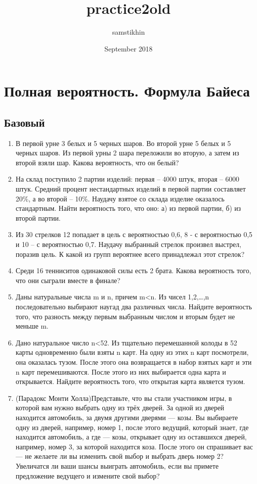 \documentclass[a4paper, 14pt]{extarticle}
\title{practice2old}
\author{samstikhin}
\date{September 2018}
\begin{document}
\section*{Полная вероятность. Формула Байеса}
\subsection*{Базовый}
\begin{enumerate}
\item В первой урне 3 белых и 5 черных шаров. Во второй урне 5 белых и 5 черных шаров. Из первой урны 2 шара переложили во вторую, а затем из второй взяли шар. Какова вероятность, что он белый?
\item На склад поступило 2 партии изделий: первая – 4000 штук, вторая – 6000 штук. Средний процент нестандартных изделий в первой партии составляет 20\%, а во второй – 10\%. Наудачу взятое со склада изделие оказалось стандартным. Найти вероятность того, что оно: а) из первой партии, б) из второй партии.
\item Из 30 стрелков 12 попадает в цель с вероятностью 0,6, 8 - с вероятностью 0,5 и 10 – с вероятностью 0,7. Наудачу выбранный стрелок произвел выстрел, поразив цель. К какой из групп вероятнее всего принадлежал этот стрелок? 
\item Среди 16 тенниситов одинаковой силы есть 2 брата. Какова вероятность того, что они сыграли вместе в финале?
\item Даны натуральные числа m и n, причем m<n. Из чисел 1,2,…,n последовательно выбирают наугад
два различных числа. Найдите вероятность того, что разность между первым выбранным числом и вторым будет не меньше m.
\item Дано натуральное число n<52. Из тщательно перемешанной колоды в 52 карты одновременно были взяты n карт. На одну из этих n карт посмотрели, она оказалась тузом. После этого она возвращается в набор взятых карт и эти n карт перемешиваются. После этого из них выбирается одна карта и открывается. Найдите вероятность того, что открытая карта является тузом.
\item (Парадокс Монти Холла)Представьте, что вы стали участником игры, в которой вам нужно выбрать одну из трёх дверей. За одной из дверей находится автомобиль, за двумя другими дверями — козы. Вы выбираете одну из дверей, например, номер 1, после этого ведущий, который знает, где находится автомобиль, а где — козы, открывает одну из оставшихся дверей, например, номер 3, за которой находится коза. После этого он спрашивает вас — не желаете ли вы изменить свой выбор и выбрать дверь номер 2? Увеличатся ли ваши шансы выиграть автомобиль, если вы примете предложение ведущего и измените свой выбор?


\end{enumerate}
\end{document}
